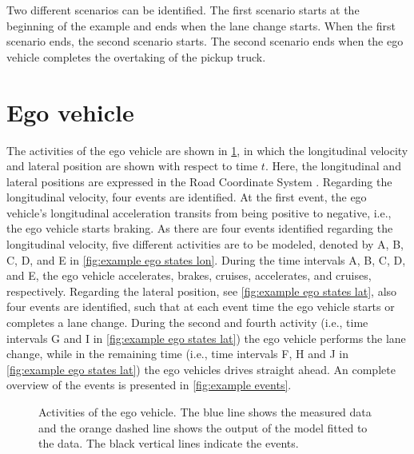 \documentclass[10pt,final,a4paper,oneside,onecolumn]{article}
\newlength\figurewidth
\newlength\figureheight
\theoremstyle{plain}\newtheorem{definition}{Definition}[section]    %
\theoremstyle{definition}\newtheorem{example}{Example}[section]     %
\theoremstyle{remark}\newtheorem{remarkenv}{Remark}[section]        %
\begin{document}
Two different scenarios can be identified. The first scenario starts at the beginning of the example and ends when the lane change starts. When the first scenario ends, the second scenario starts. The second scenario ends when the ego vehicle completes the overtaking of the pickup truck.


\section{Ego vehicle}

The activities of the ego vehicle are shown in \cref{fig:example ego states}, in which the longitudinal velocity and lateral position are shown with respect to time $t$. Here, the longitudinal and lateral positions are expressed in the Road Coordinate System \cite{zofka2015datadrivetrafficscenarios}. Regarding the longitudinal velocity, four events are identified. At the first event, the ego vehicle's longitudinal acceleration transits from being positive to negative, i.e., the ego vehicle starts braking. As there are four events identified regarding the longitudinal velocity, five different activities are to be modeled, denoted by A, B, C, D, and E in \cref{fig:example ego states lon}. During the time intervals A, B, C, D, and E, the ego vehicle accelerates, brakes, cruises, accelerates, and cruises, respectively. Regarding the lateral position, see \cref{fig:example ego states lat}, also four events are identified, such that at each event time the ego vehicle starts or completes a lane change. During the second and fourth activity (i.e., time intervals G and I in \cref{fig:example ego states lat}) the ego vehicle performs the lane change, while in the remaining time (i.e., time intervals F, H and J in \cref{fig:example ego states lat}) the ego vehicles drives straight ahead. An complete overview of the events is presented in \cref{fig:example events}.

\setlength\figureheight{170pt}
\setlength{}
\begin{figure}
	\centering
	\begin{minipage}[b]{0.49\linewidth}
		\centering
		\label{fig:example ego states lon}
	\end{minipage}%
	\hfill
	\begin{minipage}[b]{0.49\linewidth}
		\centering
		\label{fig:example ego states lat}
	\end{minipage}%
	\caption{Activities of the ego vehicle. The blue line shows the measured data and the orange dashed line shows the output of the model fitted to the data. The black vertical lines indicate the events.}
	\label{fig:example ego states}
\end{figure}
\end{document}
